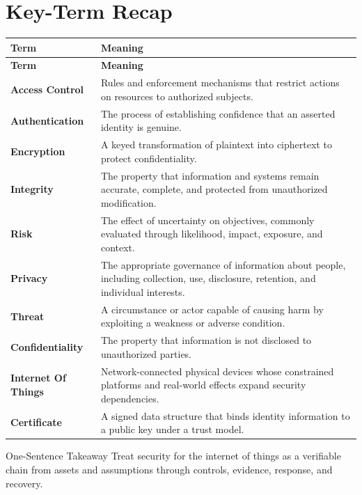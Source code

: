 \documentclass[11pt,letterpaper]{article}
\begin{document}
\section*{Key-Term Recap}
\begin{longtable}{>{\raggedright\arraybackslash}p{}>{\raggedright\arraybackslash}p{}}
\toprule\rowcolor{Navy}\color{white}\textbf{Term} & \color{white}\textbf{Meaning}\\\midrule
\endfirsthead
\toprule\rowcolor{Navy}\color{white}\textbf{Term} & \color{white}\textbf{Meaning}\\\midrule
\endhead
\textbf{Access Control} & Rules and enforcement mechanisms that restrict actions on resources to authorized subjects. \\\midrule
\textbf{Authentication} & The process of establishing confidence that an asserted identity is genuine. \\\midrule
\textbf{Encryption} & A keyed transformation of plaintext into ciphertext to protect confidentiality. \\\midrule
\textbf{Integrity} & The property that information and systems remain accurate, complete, and protected from unauthorized modification. \\\midrule
\textbf{Risk} & The effect of uncertainty on objectives, commonly evaluated through likelihood, impact, exposure, and context. \\\midrule
\textbf{Privacy} & The appropriate governance of information about people, including collection, use, disclosure, retention, and individual interests. \\\midrule
\textbf{Threat} & A circumstance or actor capable of causing harm by exploiting a weakness or adverse condition. \\\midrule
\textbf{Confidentiality} & The property that information is not disclosed to unauthorized parties. \\\midrule
\textbf{Internet Of Things} & Network-connected physical devices whose constrained platforms and real-world effects expand security dependencies. \\\midrule
\textbf{Certificate} & A signed data structure that binds identity information to a public key under a trust model. \\\midrule
\bottomrule
\end{longtable}
\begin{CornellExamBox}{One-Sentence Takeaway}
Treat security for the internet of things as a verifiable chain from assets and assumptions through controls, evidence, response, and recovery.
\end{CornellExamBox}
\end{document}
